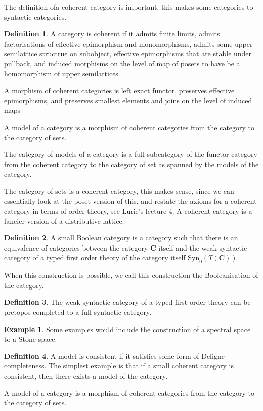 \documentclass[10pt]{article}
\theoremstyle{plain}%
\theoremstyle{definition}
\newtheorem{definition}{Definition}[section]
\newtheorem{example}{Example}[section]
\theoremstyle{remark}
\begin{document}
The definition ofa coherent category is important, this makes some categories to syntactic categories.

\begin{definition}
	A category is coherent if it admits finite limits, admits factorisations of effective epimorphism and monomorphisms, admits some upper semilattice structrue on subobject, effective epimorphisms that are stable under pullback, and induced morphisms on the level of map of posets to have be a homomorphism of upper semilattices.

	A morphism of coherent categories is left exact functor, preserves effective epimorphisms, and preserves smallest elements and joins on the level of induced maps
	
	A model of a category is a morphism of coherent categories from the category to the category of sets.

	The category of models of a category is a full subcategory of the functor category from the coherent category to the category of set as spanned by the models of the category.
\end{definition}

The category of sets is a coherent category, this makes sense, since we can essentially look at the poset version of this, and restate the axioms for a coherent category in terms of order theory, see Lurie's lecture 4. A coherent category is a fancier version of a distributive lattice.

\begin{definition}
	A small Boolean category is a category such that there is an equivalence of categories between the category $\mathbf{C}$ itself and the weak syntactic category of a typed first order theory of the category itself
	$\mathrm{Syn}_0(T(\mathbf{C}))$.
	
	When this construction is possible, we call this construction the Booleanisation of the category.
\end{definition}

\begin{definition}
	The weak syntactic category of a typed first order theory can be pretopos completed to a full syntactic category.
\end{definition}

\begin{example}
	Some examples would include the construction of a spectral space to a Stone space.
\end{example}

\begin{definition}
	A model is consistent if it satisfies some form of Deligne completeness. The simplest example is that if a small coherent category is consistent, then there exists a model of the category. 

	A model of a category is a morphism of coherent categories from the category to the category of sets.
\end{definition}
\end{document}
